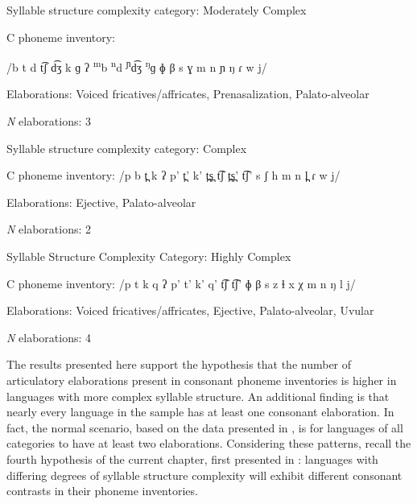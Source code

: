 \ea\label{ex:4.29}
\begin{Coding}
\item[Syllable structure complexity category:] Moderately Complex

\item[C phoneme inventory:] \item[] /b t d t͡ʃ d͡ʒ k ɡ ʔ \textsuperscript{m}b \textsuperscript{n}d \textsuperscript{ɲ}d͡ʒ \textsuperscript{ŋ}ɡ ɸ β s ɣ m n ɲ ŋ ɾ w j/

\item[Elaborations:] Voiced fricatives/affricates, Prenasalization, Palato-alveolar

\item[\textit{N} elaborations:] 3
\end{Coding}
\z

\ea\label{ex:4.30}
\begin{Coding}
\item[Syllable structure complexity category:] Complex

\item[C phoneme inventory:] /p b t̪ k ʔ p’ t̪’ k’ t̪s̪ t͡ʃ t̪s̪’ t͡ʃ’ s ʃ h m n l̪ ɾ w j/ 

\item[Elaborations:] Ejective, Palato-alveolar

\item[\textit{N} elaborations:] 2
\end{Coding}
\z

\ea\label{ex:4.31}
\begin{Coding}
\item[Syllable Structure Complexity Category:] Highly Complex

\item[C phoneme inventory:] /p t k q ʔ p’ t’ k’ q’ t͡ʃ t͡ʃ’ ɸ β s z ɬ x χ m n ŋ l j/

\item[Elaborations:] Voiced fricatives/affricates, Ejective, Palato-alveolar, Uvular 

\item[\textit{N} elaborations:] 4
\end{Coding}
\z

  The results presented here support the hypothesis that the number of articulatory elaborations present in consonant phoneme inventories is higher in languages with more complex syllable structure. An additional finding is that nearly every language in the sample has at least one consonant elaboration. In fact, the normal scenario, based on the data presented in , is for languages of all categories to have at least two elaborations. Considering these patterns, recall the fourth hypothesis of the current chapter, first presented in : languages with differing degrees of syllable structure complexity will exhibit different consonant contrasts in their phoneme inventories.

